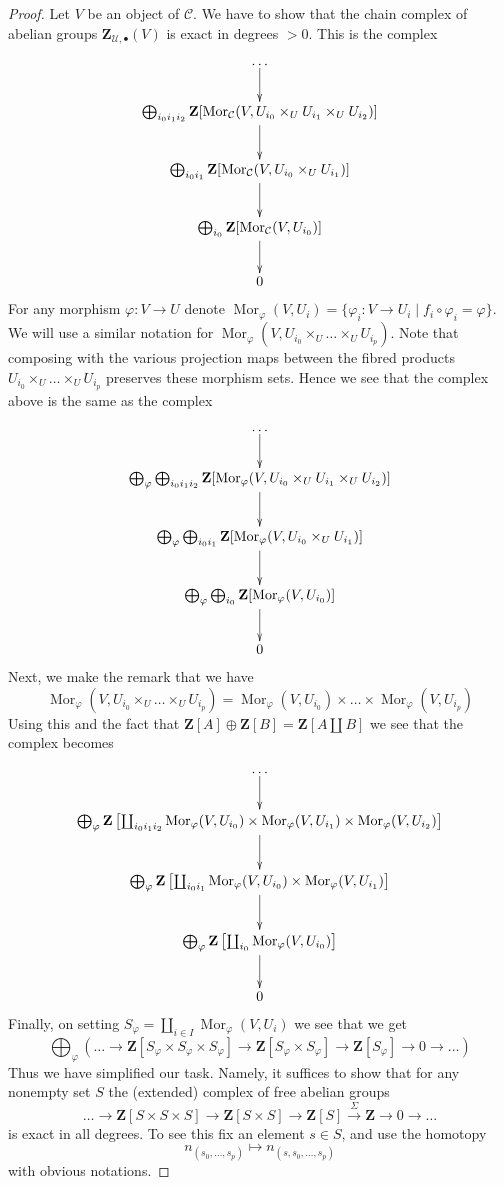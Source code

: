 \documentclass[10pt,a4paper]{amsart}
\theoremstyle{plain}
\theoremstyle{definition}
\theoremstyle{remark}
\numberwithin{equation}{subsection}
\def\Mor{\mathop{\mathrm{Mor}}\nolimits}
\begin{document}
\begin{proof}
Let $V$ be an object of $\mathcal{C}$. We have to show that the chain complex
of abelian groups $\mathbf{Z}_{\mathcal{U}, \bullet}(V)$ is exact in
degrees $> 0$. This is the complex
$$
\xymatrix{
\ldots \ar[d] \\
\bigoplus_{i_0i_1i_2}
\mathbf{Z}[
\Mor_\mathcal{C}(V, U_{i_0} \times_U U_{i_1} \times_U U_{i_2})
]
\ar[d] \\
\bigoplus_{i_0i_1}
\mathbf{Z}[
\Mor_\mathcal{C}(V, U_{i_0} \times_U U_{i_1})
]
\ar[d] \\
\bigoplus_{i_0}
\mathbf{Z}[
\Mor_\mathcal{C}(V, U_{i_0})
] \ar[d] \\
0
}
$$
For any morphism $\varphi : V \to U$ denote
$\Mor_\varphi(V, U_i) = \{\varphi_i : V \to U_i \mid
f_i \circ \varphi_i = \varphi\}$. We will use a similar notation
for $\Mor_\varphi(V, U_{i_0} \times_U \ldots \times_U U_{i_p})$.
Note that composing with the various projection maps between the
fibred products $U_{i_0} \times_U \ldots \times_U U_{i_p}$ preserves
these morphism sets. Hence we see that the complex above
is the same as the complex
$$
\xymatrix{
\ldots \ar[d] \\
\bigoplus_\varphi
\bigoplus_{i_0i_1i_2}
\mathbf{Z}[
\Mor_\varphi(V, U_{i_0} \times_U U_{i_1} \times_U U_{i_2})
]
\ar[d] \\
\bigoplus_\varphi
\bigoplus_{i_0i_1}
\mathbf{Z}[
\Mor_\varphi(V, U_{i_0} \times_U U_{i_1})
]
\ar[d] \\
\bigoplus_\varphi
\bigoplus_{i_0}
\mathbf{Z}[
\Mor_\varphi(V, U_{i_0})
] \ar[d] \\
0
}
$$
Next, we make the remark that we have
$$
\Mor_\varphi(V, U_{i_0} \times_U \ldots \times_U U_{i_p})
=
\Mor_\varphi(V, U_{i_0}) \times \ldots
\times \Mor_\varphi(V, U_{i_p})
$$
Using this and the fact that $\mathbf{Z}[A] \oplus \mathbf{Z}[B] =
\mathbf{Z}[A \amalg B]$ we see that the complex becomes
$$
\xymatrix{
\ldots \ar[d] \\
\bigoplus_\varphi
\mathbf{Z}\left[
\coprod_{i_0i_1i_2}
\Mor_\varphi(V, U_{i_0}) \times \Mor_\varphi(V, U_{i_1}) \times
\Mor_\varphi(V, U_{i_2})
\right]
\ar[d] \\
\bigoplus_\varphi
\mathbf{Z}\left[
\coprod_{i_0i_1}
\Mor_\varphi(V, U_{i_0}) \times \Mor_\varphi(V, U_{i_1})
\right]
\ar[d] \\
\bigoplus_\varphi
\mathbf{Z}\left[
\coprod_{i_0}
\Mor_\varphi(V, U_{i_0})
\right] \ar[d] \\
0
}
$$
Finally, on setting $S_\varphi = \coprod_{i \in I} \Mor_\varphi(V, U_i)$
we see that we get
$$
\bigoplus\nolimits_\varphi \left(\ldots \to
\mathbf{Z}[S_\varphi \times S_\varphi \times S_\varphi] \to
\mathbf{Z}[S_\varphi \times S_\varphi] \to
\mathbf{Z}[S_\varphi] \to 0 \to \ldots
\right)
$$
Thus we have simplified our task. Namely, it suffices to show that
for any nonempty set $S$ the (extended) complex of free abelian groups
$$
\ldots \to
\mathbf{Z}[S \times S \times S] \to
\mathbf{Z}[S \times S] \to
\mathbf{Z}[S] \xrightarrow{\Sigma} \mathbf{Z} \to 0 \to \ldots
$$
is exact in all degrees. To see this fix an element $s \in S$, and
use the homotopy
$$
n_{(s_0, \ldots, s_p)} \longmapsto n_{(s, s_0, \ldots, s_p)}
$$
with obvious notations.
\end{proof}
\end{document}
